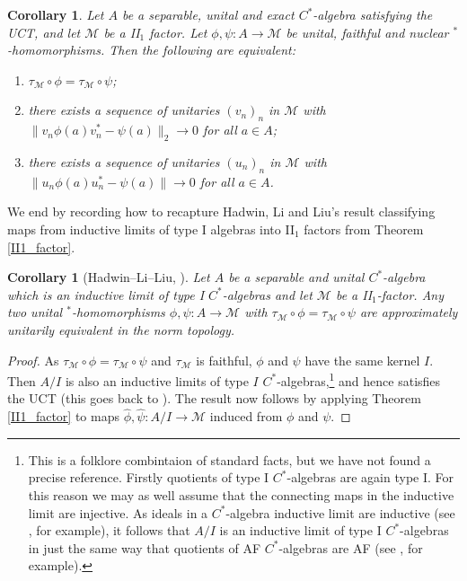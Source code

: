 \documentclass[reqno]{amsart}
\newtheorem{cor}[thm]{Corollary}
\theoremstyle{definition}
\theoremstyle{remark}
\numberwithin{equation}{section}
\theoremstyle{definition}
\newcommand{\calM}{\mathcal{M}}
\begin{document}
\begin{cor} 
    Let $A$ be a separable, unital and exact $C^*$-algebra satisfying the UCT, and let $\mathcal M$ be a II$_1$ factor.  Let $\phi,\psi\colon A\to\mathcal M$ be unital, faithful and nuclear $^*$-homomorphisms. Then the following are equivalent:
\begin{enumerate}
    \item $\tau_{\calM}\circ\phi=\tau_{\calM}\circ\psi$;
    \item there exists a sequence of unitaries $(v_n)_{n}$ in $\mathcal M$ with $\|v_n\phi(a)v_n^*-\psi(a)\|_2\to 0$ for all $a\in A$; 
    \item there exists a sequence of unitaries $(u_n)_{n}$ in $\mathcal M$ with $\|u_n\phi(a)u_n^*-\psi(a)\|\to 0$ for all $a\in A$. 
\end{enumerate}
\end{cor} 

We end by recording how to recapture Hadwin, Li and Liu's result classifying maps from inductive limits of type I algebras into II$_1$ factors from Theorem \ref{II1_factor}. 

\begin{cor}[{Hadwin--Li--Liu, \cite{LHL:OM}}]
\label{cor:HLL_reproof} 
     Let $A$ be a separable and unital $C^*$-algebra which is an inductive limit of type I $C^*$-algebras and let $\mathcal M$ be a II$_1$-factor. Any two unital $^*$-homomorphisms $\phi,\psi\colon A\to\mathcal M$ with $\tau_\mathcal M\circ\phi=\tau_\mathcal M\circ\psi$ are approximately unitarily equivalent in the norm topology.  
\end{cor}
\begin{proof} 
As $\tau_{\calM}\circ \phi = \tau_{\calM}\circ \psi$ and $\tau_{\calM}$ is faithful, $\phi$ and $\psi$ have the same kernel $I$.  Then $A/I$ is also an inductive limits of type $I$ $C^*$-algebras,\footnote{This is a folklore combintaion of standard facts, but we have not found a precise reference. Firstly quotients of type I $C^*$-algebras are again type I. For this reason we may as well assume that the connecting maps in the inductive limit are injective.  As ideals in a $C^*$-algebra inductive limit are inductive (see \cite[Lemma III.4.1]{Davidson}, for example), it follows that $A/I$ is an inductive limit of type I $C^*$-algebras in just the same way that quotients of AF $C^*$-algebras are AF (see \cite[Theorem III.4.4]{Davidson}, for example).} and hence satisfies the UCT (this goes back to \cite{RS:UCT}).  The result now follows by applying Theorem \ref{II1_factor} to maps $\hat{\phi}, \hat{\psi}: A/I\rightarrow \calM$ induced from $\phi$ and $\psi$. 
\end{proof}
\end{document}
